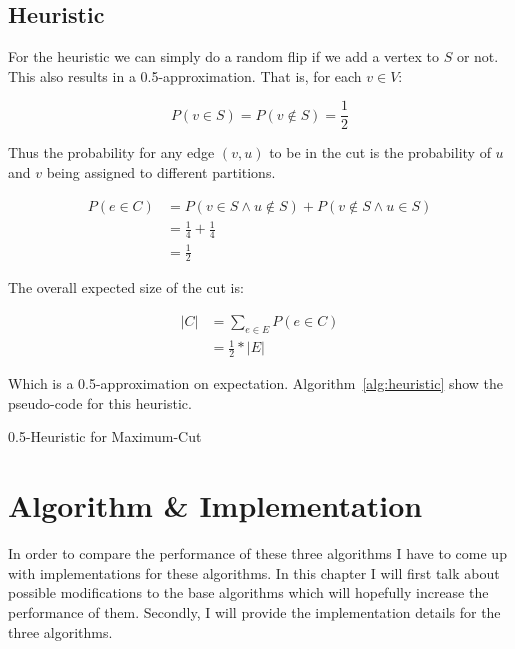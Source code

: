 \documentclass[twocolumn]{article}
\begin{document}
 
\subsection{Heuristic}

For the heuristic we can simply do a random flip if we add a vertex to $S$ or not.
This also results in a 0.5-approximation. That is, for each $v \in V$:

\[
  P(v \in S) = P(v \notin S) = \frac{1}{2}
\]

Thus the probability for any edge $(v, u)$ to be in the cut is the probability of $u$ and $v$
being assigned to different partitions.

\begin{align*}
  P(e \in C) & = P(v \in S \wedge u \notin S) + P(v \notin S \wedge u \in S) \\
  & = \frac{1}{4} + \frac{1}{4} \\
  & = \frac{1}{2}
\end{align*}

The overall expected size of the cut is:

\begin{align*}
  |C| & = \sum_{e \in E} P(e \in C) \\
  & = \frac{1}{2} * |E|
\end{align*}

Which is a 0.5-approximation on expectation.
Algorithm~\ref{alg:heuristic} show the pseudo-code for this heuristic.

\begin{algorithm}
  \caption{0.5-Heuristic for Maximum-Cut}
  \label{alg:heuristic}
\end{algorithm}


\section{Algorithm \& Implementation}
In order to compare the performance of these three algorithms I have to come up with implementations for these algorithms.
In this chapter I will first talk about possible modifications to the base algorithms which will hopefully increase the performance of them.
Secondly, I will provide the implementation details for the three algorithms.
\end{document}
